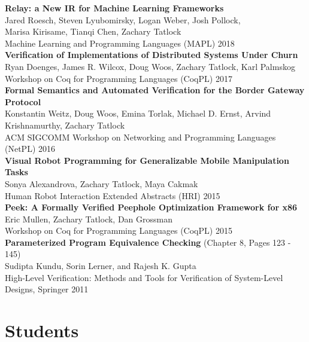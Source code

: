 \documentclass[10pt]{article}
\begin{document}
\textbf{%
Relay: a New IR for Machine Learning Frameworks
} \\
Jared Roesch, Steven Lyubomirsky, Logan Weber, Josh Pollock, \\
Marisa Kirisame, Tianqi Chen, Zachary Tatlock \\
Machine Learning and Programming Languages (MAPL) 2018 \\

\textbf{%
Verification of Implementations of Distributed Systems Under Churn
} \\
Ryan Doenges, James R. Wilcox, Doug Woos, Zachary Tatlock, Karl Palmskog \\
Workshop on Coq for Programming Languages (CoqPL) 2017 \\

\textbf{%
Formal Semantics and Automated Verification for the Border Gateway Protocol
} \\
Konstantin Weitz, Doug Woos, Emina Torlak, Michael D. Ernst, Arvind Krishnamurthy, Zachary Tatlock \\
ACM SIGCOMM Workshop on Networking and Programming Languages (NetPL) 2016 \\

\textbf{%
Visual Robot Programming for Generalizable Mobile Manipulation Tasks
} \\
Sonya Alexandrova, Zachary Tatlock, Maya Cakmak \\
Human Robot Interaction Extended Abstracts (HRI) 2015 \\

\textbf{%
Peek: A Formally Verified Peephole Optimization Framework for x86
} \\
Eric Mullen, Zachary Tatlock, Dan Grossman \\
Workshop on Coq for Programming Languages (CoqPL) 2015 \\

\textbf{%
Parameterized Program Equivalence Checking
} (Chapter 8, Pages 123 - 145) \\
Sudipta Kundu, Sorin Lerner, and Rajesh K. Gupta \\
High-Level Verification: Methods and Tools for Verification of System-Level Designs, Springer 2011


\section*{Students}
\end{document}
